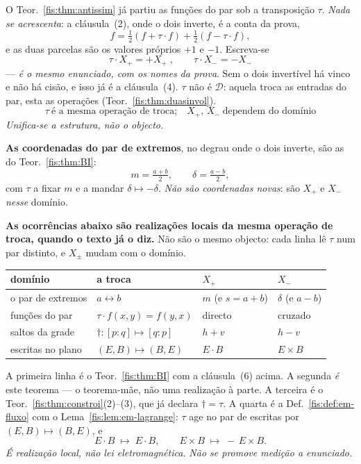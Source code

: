 \documentclass[livro.tex]{subfiles}
\begin{document}
\begin{observacao}\label{fis:obs:cisao}
O Teor.~\ref{fis:thm:antissim} já partiu as funções do par sob a transposição
$\tau$. \emph{Nada se acrescenta}: a cláusula~(2), onde o dois inverte, é a
conta da prova,
\[
f=\tfrac12(f+\tau\cdot f)+\tfrac12(f-\tau\cdot f),
\]
e as duas parcelas são os valores próprios $+1$ e $-1$. Escreva-se
\[
\boxed{\;\tau\cdot X_{+}=+X_{+}\;,\qquad \tau\cdot X_{-}=-X_{-}\;}
\]
--- \emph{é o mesmo enunciado, com os nomes da prova}. Sem o dois invertível
há vinco e não há cisão, e isso já é a cláusula~(4). $\tau$ não é
$\mathcal{D}$: aquela troca as entradas do par, esta as operações
(Teor.~\ref{fis:thm:duasinvol}).
\[
\boxed{\;\tau\ \text{é a mesma operação de troca;}\quad
X_{+},\,X_{-}\ \text{dependem do domínio}\;}
\]
\emph{Unifica-se a estrutura, não o objecto.}

\medskip\noindent\textbf{As coordenadas do par de extremos}, no degrau onde o
dois inverte, são as do Teor.~\ref{fis:thm:BI}:
\[
m=\tfrac{a+b}{2},\qquad \delta=\tfrac{a-b}{2},
\]
com $\tau$ a fixar $m$ e a mandar $\delta\mapsto-\delta$. \emph{Não são
coordenadas novas}: são $X_{+}$ e $X_{-}$ \emph{nesse} domínio.

\medskip\noindent\textbf{As ocorrências abaixo são realizações locais da mesma
operação de troca, quando o texto já o diz.} Não são o mesmo objecto: cada
linha lê $\tau$ num par distinto, e $X_{\pm}$ mudam com o domínio.
\begin{center}\small
\begin{tabular}{@{}llll@{}}
\toprule
domínio & a troca & $X_{+}$ & $X_{-}$ \\
\midrule
o par de extremos & $a\leftrightarrow b$ & $m$ (e $s=a+b$) & $\delta$ (e $a-b$) \\
funções do par & $\tau\cdot f(x,y)=f(y,x)$ & directo & cruzado \\
saltos da grade & $\dagger\colon[p:q]\mapsto[q:p]$ & $h+v$ & $h-v$ \\
escritas no plano & $(E,B)\mapsto(B,E)$ & $E\cdot B$ & $E\times B$ \\
\bottomrule
\end{tabular}
\end{center}
A primeira linha é o Teor.~\ref{fis:thm:BI} com a cláusula~(6) acima. A
segunda \emph{é} este teorema --- o teorema-mãe, não uma realização à parte.
A terceira é o Teor.~\ref{fis:thm:constroi}(2)--(3), que já declara
$\dagger=\tau$. A quarta é a Def.~\ref{fis:def:em-fluxo} com o
Lema~\ref{fis:lem:em-lagrange}: $\tau$ age no par de escritas por
$(E,B)\mapsto(B,E)$, e
\[
E\cdot B\;\longmapsto\; E\cdot B,\qquad
E\times B\;\longmapsto\; -\,E\times B.
\]
\emph{É realização local, não lei eletromagnética.} \emph{Não se promove
medição a enunciado.}


\end{observacao}
\end{document}
